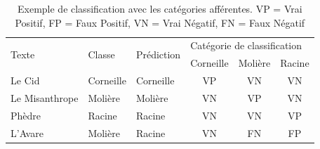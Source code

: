 \begin{table}[]
\centering
\begin{tabular}{lllccc}
\toprule
\multirow{2}{*}{Texte} & \multirow{2}{*}{Classe} & \multirow{2}{*}{Prédiction} & \multicolumn{3}{l}{Catégorie de classification} \\
                       &                         &                             & Corneille        & Molière       & Racine       \\ \midrule
Le Cid                 & Corneille               & Corneille                   & VP               & VN            & VN           \\
Le Misanthrope         & Molière                 & Molière                     & VN               & VP            & VN           \\
Phèdre                 & Racine                  & Racine                      & VN               & VN            & VP           \\
L'Avare                & Molière                 & Racine                      & VN               & FN            & FP          \\ \bottomrule
\end{tabular}
\caption{Exemple de classification avec les catégories afférentes. VP = Vrai Positif, FP = Faux Positif, VN = Vrai Négatif, FN = Faux Négatif}
\label{deep-learning:table:true-positives}
\end{table}

